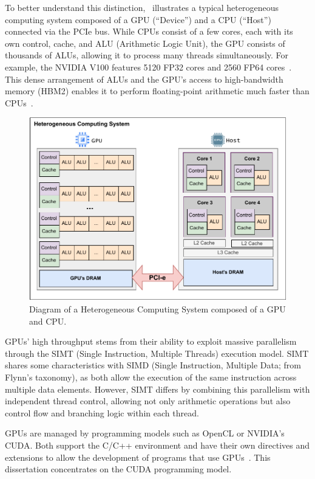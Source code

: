 \documentclass[Ingles]{ic-tese-v3}
\begin{document}
To better understand this distinction,~ illustrates a typical heterogeneous computing system composed of a GPU (``Device'') and a CPU (``Host'') connected via the PCIe bus. While CPUs consist of a few cores, each with its own control, cache, and ALU (Arithmetic Logic Unit), the GPU consists of thousands of ALUs, allowing it to process many threads simultaneously. For example, the NVIDIA V100 features 5120 FP32 cores and 2560 FP64 cores~\cite{v100}. This dense arrangement of ALUs and the GPU's access to high-bandwidth memory (HBM2) enables it to perform floating-point arithmetic much faster than CPUs~\cite{kirk}.

\begin{figure}[h!]
    \centering
    \includegraphics[width=0.8\linewidth,clip]{figures/gpu.pdf}
    \caption[System with GPU and CPU diagram]{Diagram of a Heterogeneous Computing System composed of a GPU and CPU.}
    \label{fig:gpu}
\end{figure}

GPUs' high throughput stems from their ability to exploit massive parallelism through the SIMT (Single Instruction, Multiple Threads) execution model. SIMT shares some characteristics with SIMD (Single Instruction, Multiple Data; from Flynn's taxonomy), as both allow the execution of the same instruction across multiple data elements. However, SIMT differs by combining this parallelism with independent thread control, allowing not only arithmetic operations but also control flow and branching logic within each thread\cite{cuda}.

GPUs are managed by programming models such as OpenCL or NVIDIA's CUDA. Both support the C/C++ environment and have their own directives and extensions to allow the development of programs that use GPUs~\cite{kirk}. This dissertation concentrates on the CUDA programming model.
\end{document}
